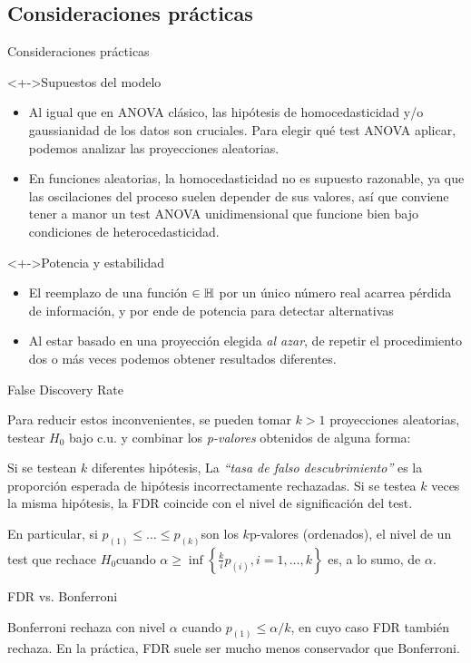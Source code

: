 \documentclass[10pt,spanish,handout]{beamer}\usepackage[]{graphicx}\usepackage[]{color}
\begin{document}
\subsection{Consideraciones prácticas}
\begin{frame}{Consideraciones prácticas}
\begin{alertblock}<+->{Supuestos del modelo}
\begin{itemize}[<+->]
\item Al igual que en ANOVA clásico, las hipótesis de homocedasticidad
y/o gaussianidad de los datos son cruciales. Para elegir qué test
ANOVA aplicar, podemos analizar las proyecciones aleatorias. 
\item En funciones aleatorias, la homocedasticidad no es supuesto razonable,
ya que las oscilaciones del proceso suelen depender de sus valores,
así que conviene tener a manor un test ANOVA unidimensional que funcione
bien bajo condiciones de heterocedasticidad.
\end{itemize}
\end{alertblock}

\pause{}
\begin{alertblock}<+->{Potencia y estabilidad}
\begin{itemize}[<+->]
\item El reemplazo de una función $\in\mathbb{H}$ por un único número real acarrea
pérdida de información, y por ende de potencia para detectar alternativas
\item Al estar basado en una proyección elegida \emph{al azar}, de repetir
el procedimiento dos o más veces podemos obtener resultados diferentes.
\end{itemize}
\end{alertblock}
\end{frame}
%
\begin{frame}{False Discovery Rate}

Para reducir estos inconvenientes, se pueden tomar $k>1$ proyecciones
aleatorias, testear $H_{0}$ bajo c.u. y combinar los \emph{p-valores}
obtenidos de alguna forma:  

\pause{}

Si se testean $k$ diferentes hipótesis, La \emph{“tasa de falso
descubrimiento”} es la proporción esperada de hipótesis incorrectamente
rechazadas. Si se testea $k$ veces la misma hipótesis, la FDR coincide
con el nivel de significación del test. 

\pause{}

En particular, si $p_{\left(1\right)}\leq\dots\leq p_{\left(k\right)}$son
los $k$p-valores (ordenados), el nivel de un test que rechace $H_{0}$cuando
$\alpha\geq\inf\left\{ \frac{k}{i}p_{\left(i\right)},i=1,\dots,k\right\} $
es, a lo sumo, de $\alpha$.

\pause{}
\begin{alertblock}{FDR vs. Bonferroni}

Bonferroni rechaza con nivel $\alpha$ cuando $p_{\left(1\right)}\leq$$\alpha/k$,
en cuyo caso FDR también rechaza. En la práctica, FDR suele ser mucho
menos conservador que Bonferroni.
\end{alertblock}
\end{frame}
\end{document}
